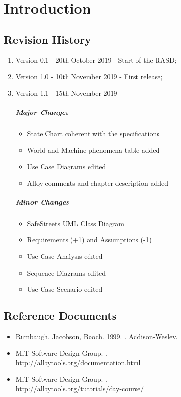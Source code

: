 \documentclass[../RASD.tex]{subfiles}
\begin{document}
\chapter{Introduction}
\thispagestyle{fancy}
		
		
		
		
	
		\section{Revision History}
		\begin{enumerate}
			\item Version 0.1 - 20th October 2019 - Start of the RASD;
			\item Version 1.0 - 10th November 2019 - First release;
			\item Version 1.1 - 15th November 2019
				\paragraph{Major Changes}
				\begin{itemize}
					\item {} State Chart coherent with the specifications 
					\item World and Machine phenomena table added
					\item Use Case Diagrams edited
					\item Alloy comments and chapter description added
				\end{itemize}
				\paragraph{Minor Changes}
				\begin{itemize}
					\item SafeStreets UML Class Diagram
					\item Requirements (+1) and Assumptions (-1)
					\item Use Case Analysis edited
					\item Sequence Diagrams edited
					\item Use Case Scenario edited
				\end{itemize}

		\end{enumerate}
		\section{Reference Documents}
		\begin{itemize}
		\item Rumbaugh, Jacobson, Booch. 1999. . Addison-Wesley.
		\item MIT Software Design Group. . \\http://alloytools.org/documentation.html
		\item MIT Software Design Group. . \\http://alloytools.org/tutorials/day-course/
		\end{itemize}
\end{document}
